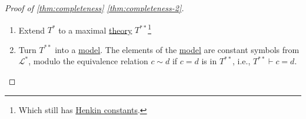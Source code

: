 \begin{proof}[Proof of \autoref{thm:completeness} \autoref{thm:completeness-2}]
\begin{enumerate}
\begin{explanation}
			      So
			      \[
				      T_0 \cup \left\{ \theta _{\ell _1}, \ldots , \theta _{\ell _m} \right\} \vdash \lnot \theta _{\varphi _{m+1}},
			      \]
			      and \(\varphi _{m+1}\) is of the form \(\lnot \forall x\ \psi (x)\), and \(\theta _{\ell _{m+1}}\) is \(\big(\lnot \forall x\ \psi (x)\big) \to \lnot \psi (c_{\ell } ) \). By (A1), (A2), (A3),
			      \[
				      T_0 \cup \left\{ \theta _{\ell _1}, \ldots , \theta _{\ell _m} \right\} \vdash \lnot \forall x\ \psi (x)
			      \]
			      and
			      \[
				      T_0 \cup \left\{ \theta _{\ell _1}, \ldots , \theta _{\ell _m} \right\} \vdash \psi (c_{\ell }).
			      \]
			      Since \(c_{\ell } \) does not appear in \(T_0 \cup \left\{ \theta _{\ell _1}, \ldots , \theta _{\ell _m} \right\} \), so
			      \[
				      T_0 \cup \left\{ \theta _{\ell _1}, \ldots , \theta _{\ell _m} \right\} \vdash \forall x\ \psi (x).
			      \]
			      So \(T_0 \cup \left\{ \theta _{\ell _1}, \ldots , \theta _{\ell _m} \right\} \) is \hyperref[def:consistent]{inconsistent}, a contradiction, so \(T_1\) is \hyperref[def:consistent]{consistent}.
		      \end{explanation}

		      Given \(T_{i} \) and \(\mathcal{L} _i\), define a \(T_{i+1}\) and \(\mathcal{L} _{i+1}\) in this way. Each \(T_i\) is \hyperref[def:consistent]{consistent}, then, \(T^{\ast} = \bigcup T_i\) is an \hyperref[def:theory]{\(\mathcal{L} ^{\ast} = \bigcup \mathcal{L} _i\)-theory}. \(T^{\ast} \) is \hyperref[def:consistent]{consistent} as a nested union of \hyperref[def:consistent]{consistent} \hyperref[def:theory]{theories}, and \(T^{\ast} \) has \hyperref[def:Henkin-constant]{Henkin constants} because every \hyperref[def:formula]{\(\mathcal{L} ^{\ast} \)-formula} \(\varphi \) is an \hyperref[def:formula]{\(\mathcal{L} _i\)-formula} for some \(i\), and \(\theta _\ell \in T_{i+1} \subseteq T^{\ast} \).
		\item Extend \(T^{\ast} \) to a maximal \hyperref[def:theory]{theory} \(T^{\ast\ast} \)\footnote{Which still has \hyperref[def:Henkin-constant]{Henkin constants}.}
		\item Turn \(T^{\ast\ast} \) into a \hyperref[def:model]{model}. The elements of the \hyperref[def:model]{model} are constant symbols from \(\mathcal{L} ^{\ast} \), modulo the equivalence relation \(c \sim d\) if \(c=d\) is in \(T^{\ast\ast} \), i.e., \(T^{\ast\ast} \vdash c = d\).
	\end{enumerate}
\end{proof}